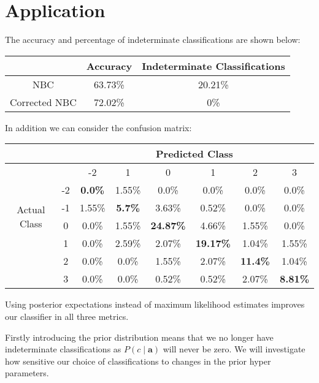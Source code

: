 \section{Application}

The accuracy and percentage of indeterminate classifications are shown below:
\begin{center}
	\begin{tabular}{ c|c c }
		              & Accuracy & Indeterminate Classifications\\
		\hline
		NBC           & 63.73\%  & 20.21\% \\
		Corrected NBC & 72.02\%  & 0\%
	\end{tabular}
\end{center}

In addition we can consider the confusion matrix:
\begin{center}
    \begin{tabular}{c c c c c c c c}
    \hline
                       &    & \multicolumn{6}{c}{Predicted Class}                   \\
    \hline
                       &    & -2      & 1       & 0       & 1       & 2       & 3   \\
    \hline
    \multirow{4}{*}{Actual Class} & -2 & \textbf{0.0\%}  & 1.55\% & 0.0\%   & 0.0\%   & 0.0\%  & 0.0\%  \\
                       & -1 & 1.55\% & \textbf{5.7\%}  & 3.63\%  & 0.52\%  & 0.0\%  & 0.0\%  \\
                       & 0  & 0.0\%  & 1.55\% & \textbf{24.87\%} & 4.66\%  & 1.55\% & 0.0\%  \\
                       & 1  & 0.0\%  & 2.59\% & 2.07\%  & \textbf{19.17\%} & 1.04\% & 1.55\% \\
                       & 2  & 0.0\%  & 0.0\%  & 1.55\%  & 2.07\%  & \textbf{11.4\%} & 1.04\% \\
                       & 3  & 0.0\%  & 0.0\%  & 0.52\%  & 0.52\%  & 2.07\% & \textbf{8.81\%} \\
    \hline
    \end{tabular}
\end{center}

Using posterior expectations instead of maximum likelihood estimates improves our classifier in all three metrics.

Firstly introducing the prior distribution means that we no longer have indeterminate classifications as $P(c \mid \mathbf{a})$ will never be zero.
We will investigate how sensitive our choice of classifications to changes in the prior hyper parameters.

